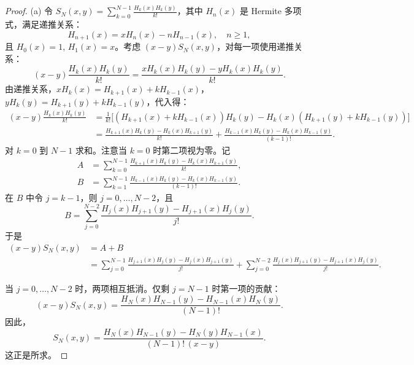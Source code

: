\begin{proof}
(a)
令 $S_N(x,y) = \sum_{k=0}^{N-1} \frac{H_k(x)H_k(y)}{k!}$，其中 $H_n(x)$ 是 Hermite 多项式，满足递推关系：
\begin{equation}
H_{n+1}(x) = x H_n(x) - n H_{n-1}(x), \quad n \geq 1,
\end{equation}
且 $H_0(x)=1$, $H_1(x)=x$。考虑 $(x-y)S_N(x,y)$，对每一项使用递推关系：
\[
(x-y) \frac{H_k(x)H_k(y)}{k!} = \frac{x H_k(x)H_k(y) - y H_k(x)H_k(y)}{k!}.
\]
由递推关系，$x H_k(x) = H_{k+1}(x) + k H_{k-1}(x)$，$y H_k(y) = H_{k+1}(y) + k H_{k-1}(y)$，代入得：
\begin{align*}
(x-y) \frac{H_k(x)H_k(y)}{k!} &= \frac{1}{k!}\bigl[(H_{k+1}(x) + k H_{k-1}(x)) H_k(y) - H_k(x)(H_{k+1}(y) + k H_{k-1}(y))\bigr] \\
&= \frac{H_{k+1}(x)H_k(y) - H_k(x)H_{k+1}(y)}{k!} + \frac{H_{k-1}(x)H_k(y) - H_k(x)H_{k-1}(y)}{(k-1)!}.
\end{align*}
对 $k=0$ 到 $N-1$ 求和。注意当 $k=0$ 时第二项视为零。记
\begin{align*}
A &= \sum_{k=0}^{N-1} \frac{H_{k+1}(x)H_k(y) - H_k(x)H_{k+1}(y)}{k!}, \\
B &= \sum_{k=1}^{N-1} \frac{H_{k-1}(x)H_k(y) - H_k(x)H_{k-1}(y)}{(k-1)!}.
\end{align*}
在 $B$ 中令 $j=k-1$，则 $j=0,\dots,N-2$，且
\[
B = \sum_{j=0}^{N-2} \frac{H_j(x)H_{j+1}(y) - H_{j+1}(x)H_j(y)}{j!}.
\]
于是
\begin{equation*}
\begin{aligned}
    (x-y)S_N(x,y) &= A + B \\
    &= \sum_{j=0}^{N-1} \frac{H_{j+1}(x)H_j(y) - H_j(x)H_{j+1}(y)}{j!} + \sum_{j=0}^{N-2} \frac{H_j(x)H_{j+1}(y) - H_{j+1}(x)H_j(y)}{j!}.
\end{aligned}
\end{equation*}


当 $j=0,\dots,N-2$ 时，两项相互抵消。仅剩 $j=N-1$ 时第一项的贡献：
\[
(x-y)S_N(x,y) = \frac{H_N(x)H_{N-1}(y) - H_{N-1}(x)H_N(y)}{(N-1)!}.
\]
因此，
\[
S_N(x,y) = \frac{H_N(x)H_{N-1}(y) - H_N(y)H_{N-1}(x)}{(N-1)!\,(x-y)}.
\]
这正是所求。



\end{proof}
